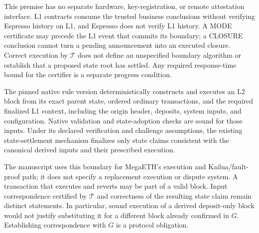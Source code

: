 This premise has no separate hardware, key-registration, or remote
attestation interface.  L1 contracts consume the trusted business
conclusions without verifying Espresso history on L1, and Espresso
does not verify L1 history.  A MODE certificate may precede the L1 event
that commits its boundary; a CLOSURE conclusion cannot turn a pending
announcement into an executed closure.  Correct execution by
$\mathcal T$ does not define an unspecified boundary algorithm or
establish that a proposed state root has settled.  Any required
response-time bound for the certifier is a separate progress condition.

\begin{assumption}
\label{ass:native-execution}
The pinned native rule version deterministically constructs and executes
an L2 block from its exact parent state, ordered ordinary transactions,
and the required finalized L1 context, including the origin header,
deposits, system inputs, and configuration.  Native validation and
state-adoption checks are sound for those inputs.  Under its declared
verification and challenge assumptions, the existing state-settlement
mechanism finalizes only state claims consistent with the canonical
derived inputs and their prescribed execution.
\end{assumption}

The manuscript uses this boundary for MegaETH's execution and
Kailua/fault-proof path; it does not specify a replacement execution or
dispute system.  A transaction that executes and reverts may be part of
a valid block.  Input correspondence certified by $\mathcal T$ and
correctness of the resulting state claim remain distinct statements.
In particular, sound execution of a derived deposit-only block would
not justify substituting it for a different block already confirmed in
$G$.  Establishing correspondence with $G$ is a protocol obligation.

